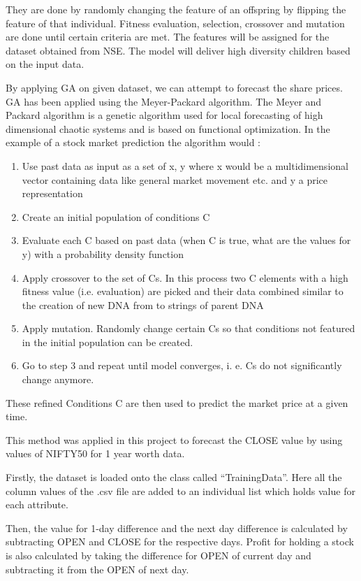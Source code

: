 \documentclass[BTech]{srmuthesis}
\begin{document}
They are done by randomly changing the feature of an offspring by flipping the feature of that individual. Fitness evaluation, selection, crossover and mutation are done until certain criteria are met. The features will be assigned for the dataset obtained from NSE. The model will deliver high diversity children based on the input data.

By applying GA on given dataset, we can attempt to forecast the share prices.
GA has been applied using the Meyer-Packard algorithm. The Meyer and Packard algorithm is a genetic algorithm used for local forecasting of high dimensional chaotic systems and is based on functional optimization. In the example of a stock market prediction the algorithm would :

\begin{enumerate}
	\item Use past data as input as a set of {x, y} where x would be a multidimensional vector containing data like general market movement etc. and y a price representation
	\item Create an initial population of conditions C
	\item Evaluate each C based on past data (when C is true, what are the values for y) with a probability density function
	\item Apply crossover to the set of C\textquotesingle s. In this process two C elements with a high fitness value (i.e. evaluation) are picked and their data combined similar to the creation of new DNA from to strings of parent DNA
	\item Apply mutation. Randomly change certain C\textquotesingle s so that conditions not featured in the initial population can be created.
	\item Go to step 3 and repeat until model converges, i. e. C\textquotesingle s do not significantly change anymore.
\end{enumerate}

These refined Conditions C are then used to predict the market price at a given time. 

This method was applied in this project to forecast the CLOSE value by using values of NIFTY50 for 1 year worth data.

Firstly, the dataset is loaded onto the class called ``TrainingData''. Here all the column values of the .csv file are added to an individual list which holds value for each attribute. 

Then, the value for 1-day difference and the next day difference is calculated by subtracting OPEN and CLOSE for the respective days. Profit for holding a stock is also calculated by taking the difference for OPEN of current day and subtracting it from the OPEN of next day.
\end{document}
